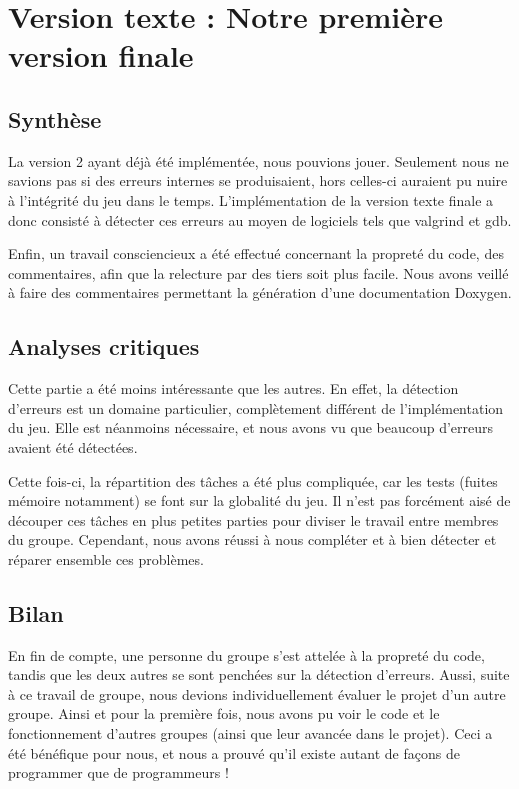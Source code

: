 \documentclass[12pt]{article}
\begin{document}
\section{Version texte : Notre première version finale}
\subsection{Synthèse}
La version 2 ayant déjà été implémentée, nous pouvions jouer. Seulement nous ne savions pas si des erreurs internes se produisaient, hors celles-ci auraient pu nuire à l'intégrité du jeu dans le temps. L'implémentation de la version texte finale a donc consisté à détecter ces erreurs au moyen de logiciels tels que valgrind et gdb.

Enfin, un travail consciencieux a été effectué concernant la propreté du code, des commentaires, afin que la relecture par des tiers soit plus facile. Nous avons veillé à faire des commentaires permettant la génération d'une documentation Doxygen.

\subsection{Analyses critiques}
Cette partie a été moins intéressante que les autres. En effet, la détection d'erreurs est un domaine particulier, complètement différent de l'implémentation du jeu. Elle est néanmoins nécessaire, et nous avons vu que beaucoup d'erreurs avaient été détectées.

Cette fois-ci, la répartition des tâches a été plus compliquée, car les tests (fuites mémoire notamment) se font sur la globalité du jeu. Il n'est pas forcément aisé de découper ces tâches en plus petites parties pour diviser le travail entre membres du groupe. Cependant, nous avons réussi à nous compléter et à bien détecter et réparer ensemble ces problèmes.

\subsection{Bilan}
En fin de compte, une personne du groupe s'est attelée à la propreté du code, tandis que les deux autres se sont penchées sur la détection d'erreurs. Aussi, suite à ce travail de groupe, nous devions individuellement évaluer le projet d'un autre groupe. Ainsi et pour la première fois, nous avons pu voir le code et le fonctionnement d'autres groupes (ainsi que leur avancée dans le projet). Ceci a été bénéfique pour nous, et nous a prouvé qu'il existe autant de façons de programmer que de programmeurs !
\end{document}
